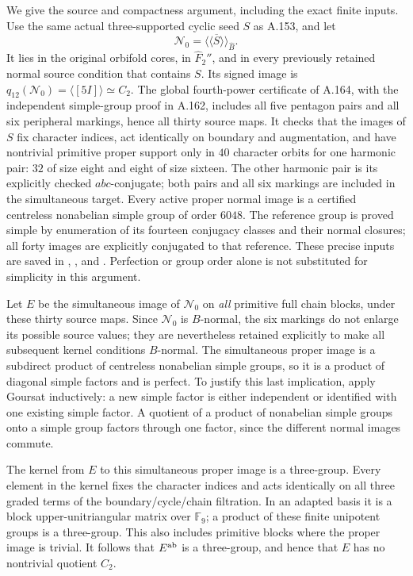 We give the source and compactness argument, including the
exact finite inputs. Use the same actual three-supported
cyclic seed $S$ as A.153, and let
\[
         \mathcal N_0=\overline{\langle\!\langle S
                              \rangle\!\rangle}_{\widehat B}.
\]
It lies in the original orbifold cores, in $\widehat F_2''$,
and in every previously retained normal source condition
that contains $S$. Its signed image is
$q_{12}(\mathcal N_0)=\langle[5I]\rangle\simeq C_2$.
The global fourth-power certificate of A.164, with the
independent simple-group proof in A.162, includes all five
pentagon pairs and all six peripheral markings, hence all
thirty source maps. It checks that the images of $S$ fix
character indices, act identically on boundary and
augmentation, and have nontrivial primitive proper support
only in $40$ character orbits for one harmonic pair: $32$
of size eight and eight of size sixteen. The other harmonic
pair is its explicitly checked $abc$-conjugate; both pairs
and all six markings are included in the simultaneous target.
Every active proper normal image
is a certified centreless nonabelian simple group of order
$6048$. The reference group is proved simple by enumeration
of its fourteen conjugacy classes and their normal closures;
all forty images are explicitly conjugated to that reference.
These precise inputs are saved in
,
, and
.
Perfection or group order alone is not substituted for
simplicity in this argument.

Let $E$ be the simultaneous image of $\mathcal N_0$ on
\emph{all} primitive full chain blocks, under these thirty
source maps. Since $\mathcal N_0$ is $B$-normal, the six
markings do not enlarge its possible source values; they
are nevertheless retained explicitly to make all subsequent
kernel conditions $B$-normal. The simultaneous proper image
is a subdirect product of centreless nonabelian simple groups,
so it is a product of diagonal simple factors and is perfect.
To justify this last implication, apply Goursat inductively:
a new simple factor is either independent or identified with
one existing simple factor. A quotient of a product of
nonabelian simple groups onto a simple group factors through
one factor, since the different normal images commute.

The kernel from $E$ to this simultaneous proper image is a
three-group. Every element in the kernel fixes the character
indices and acts identically on all three graded terms of
the boundary/cycle/chain filtration. In an adapted basis it
is a block upper-unitriangular matrix over $\mathbb F_9$;
a product of these finite unipotent groups is a three-group.
This also includes primitive blocks where the proper image
is trivial. It follows that $E^{\rm ab}$ is a three-group,
and hence that $E$ has no nontrivial quotient $C_2$.

